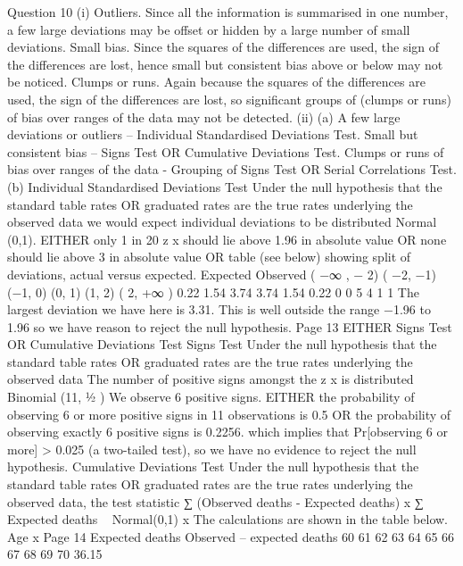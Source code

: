 \documentclass[a4paper,12pt]{article}
\begin{document}
\begin{enumerate}
\newpage
Question 10
(i)
Outliers. Since all the information is summarised in one number, a few large
deviations may be offset or hidden by a large number of small deviations.
Small bias. Since the squares of the differences are used, the sign of the differences are lost, hence small but consistent bias above or below may not be noticed.
Clumps or runs. Again because the squares of the differences are used, the sign of the differences are lost, so significant groups of (clumps or runs) of bias over ranges of the data may not be detected.
(ii)
(a)
A few large deviations or outliers – Individual Standardised Deviations Test.
Small but consistent bias – Signs Test OR Cumulative Deviations Test.
Clumps or runs of bias over ranges of the data - Grouping of Signs Test OR
Serial Correlations Test.
(b)
Individual Standardised Deviations Test
Under the null hypothesis that the standard table rates OR graduated
rates are the true rates underlying the observed data we would expect individual deviations to be distributed Normal (0,1).
EITHER only 1 in 20 z x should lie above 1.96 in absolute value
OR none should lie above 3 in absolute value
OR table (see below) showing split of deviations, actual versus expected.
Expected
Observed
( −∞ , − 2) ( −2, −1) (−1, 0) (0, 1) (1, 2) ( 2, +∞ )
0.22
1.54 3.74 3.74 1.54
0.22
0
0
5
4
1
1
The largest deviation we have here is 3.31.
This is well outside the range −1.96 to 1.96 so we have reason to reject the
null hypothesis.
Page 13%
EITHER Signs Test OR Cumulative Deviations Test
Signs Test
Under the null hypothesis that the standard table rates OR graduated
rates are the true rates underlying the observed data
The number of positive signs amongst the z x is distributed Binomial (11, 1⁄2 )
We observe 6 positive signs.
EITHER the probability of observing 6 or more positive signs in 11
observations is 0.5
OR the probability of observing exactly 6 positive signs is 0.2256.
which implies that Pr[observing 6 or more] > 0.025 (a two-tailed test),
so we have no evidence to reject the null hypothesis.
Cumulative Deviations Test
Under the null hypothesis that the standard table rates OR graduated
rates are the true rates underlying the observed data,
the test statistic
∑ (Observed deaths - Expected deaths)
x
∑ Expected deaths
~ Normal(0,1)
x
The calculations are shown in the table below.
Age x
Page 14
Expected deaths
Observed – expected
deaths
60
61
62
63
64
65
66
67
68
69
70 36.15

\end{enumerate}
\end{document}
